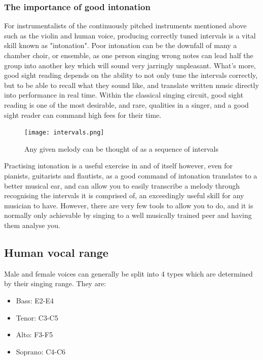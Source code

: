 	\subsubsection{The importance of good intonation}
	\par For instrumentalists of the continuously pitched instruments mentioned above such as the violin and human voice, producing correctly tuned intervals is a vital skill known as "intonation". Poor intonation can be the downfall of many a chamber choir, or ensemble, as one person singing wrong notes can lead half the group into another key which will sound very jarringly unpleasant. What's more, good sight reading depends on the ability to not only tune the intervals correctly, but to be able to recall what they sound like, and translate written music directly into performance in real time. Within the classical singing circuit, good sight reading is one of the most desirable, and rare, qualities in a singer, and a good sight reader can command high fees for their time.
	\begin{figure}[h]
		\centering
		\texttt{[image: intervals.png]}
		\caption{Any given melody can be thought of as a sequence of intervals}
	\end{figure}		
	
	\par Practising intonation is a useful exercise in and of itself however, even for pianists, guitarists and flautists, as a good command of intonation translates to a better musical ear, and can allow you to easily transcribe a melody through recognising the intervals it is comprised of, an exceedingly useful skill for any musician to have. However, there are very few tools to allow you to do, and it is normally only achievable by singing to a well musically trained peer and having them analyse you.
	
	\subsection{Human vocal range}
	Male and female voices can generally be split into 4 types which are determined by their singing range. They are:
	\begin{itemize}
		\item Bass: E2-E4
		\item Tenor: C3-C5
		\item Alto: F3-F5
		\item Soprano: C4-C6
	\end{itemize}
	
